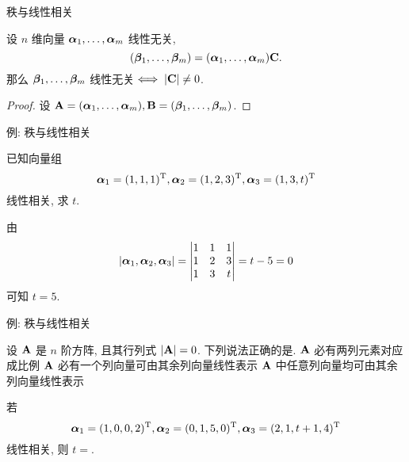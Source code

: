\begin{frame}{秩与线性相关}
	\onslide<+->
	\begin{proposition}
		设 $n$ 维向量 ${\boldsymbol{\alpha}}_1,\dots,{\boldsymbol{\alpha}}_m$ 线性无关, 
		\[({\boldsymbol{\beta}}_1,\dots,{\boldsymbol{\beta}}_m)=({\boldsymbol{\alpha}}_1,\dots,{\boldsymbol{\alpha}}_m){\mathbf{C}}.\]
		那么 ${\boldsymbol{\beta}}_1,\dots,{\boldsymbol{\beta}}_m$ 线性无关$\iff |{\mathbf{C}}|\neq0$.
	\end{proposition}
	\onslide<+->
	\begin{proof}
		设 ${\mathbf{A}}=({\boldsymbol{\alpha}}_1,\dots,{\boldsymbol{\alpha}}_m),{\mathbf{B}}=({\boldsymbol{\beta}}_1,\dots,{\boldsymbol{\beta}}_m)$.
		\onslide<+->{%
		于是命题得证.
		}
	\end{proof}
\end{frame}


\begin{frame}{例: 秩与线性相关}
	\onslide<+->
	\begin{example}
		已知向量组
		\[{\boldsymbol{\alpha}}_1=(1,1,1)^{\mathrm{T}},{\boldsymbol{\alpha}}_2=(1,2,3)^{\mathrm{T}},{\boldsymbol{\alpha}}_3=(1,3,t)^{\mathrm{T}}\]
		线性相关, 求 $t$.
	\end{example}
	\onslide<+->
	\begin{solution}
		由
		\[|{\boldsymbol{\alpha}}_1,{\boldsymbol{\alpha}}_2,{\boldsymbol{\alpha}}_3|=\begin{vmatrix}
			1&1&1\\
			1&2&3\\
			1&3&t
		\end{vmatrix}=t-5=0\]
		可知 $t=5$.
	\end{solution}
\end{frame}


\begin{frame}{例: 秩与线性相关}
	\onslide<+->
	\begin{exercise}
		设 ${\mathbf{A}}$ 是 $n$ 阶方阵, 且其行列式 $|{\mathbf{A}}|=0$. 下列说法正确的是.
		{${\mathbf{A}}$ 必有两列元素对应成比例}%
		{${\mathbf{A}}$ 必有一个列向量可由其余列向量线性表示}%
		{${\mathbf{A}}$ 中任意列向量均可由其余列向量线性表示}
	\end{exercise}
	\onslide<+->
	\begin{exercise}
		若
		\[{\boldsymbol{\alpha}}_1=(1,0,0,2)^{\mathrm{T}},
		{\boldsymbol{\alpha}}_2=(0,1,5,0)^{\mathrm{T}},
		{\boldsymbol{\alpha}}_3=(2,1,t+1,4)^{\mathrm{T}}\]
		线性相关, 则 $t=$\fillblank{\visible<+->{3}}.
	\end{exercise}
\end{frame}


